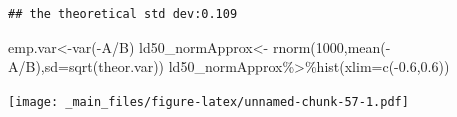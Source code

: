 \documentclass[
]{book}
\newenvironment{Shaded}{\begin{snugshade}}{\end{snugshade}}
\newcommand{\AttributeTok}[1]{\textcolor[rgb]{0.77,0.63,0.00}{#1}}
\newcommand{\DecValTok}[1]{\textcolor[rgb]{0.00,0.00,0.81}{#1}}
\newcommand{\FloatTok}[1]{\textcolor[rgb]{0.00,0.00,0.81}{#1}}
\newcommand{\FunctionTok}[1]{\textcolor[rgb]{0.00,0.00,0.00}{#1}}
\newcommand{\NormalTok}[1]{#1}
\newcommand{\OtherTok}[1]{\textcolor[rgb]{0.56,0.35,0.01}{#1}}
\newcommand{\SpecialCharTok}[1]{\textcolor[rgb]{0.00,0.00,0.00}{#1}}
\newcommand{\StringTok}[1]{\textcolor[rgb]{0.31,0.60,0.02}{#1}}
\theoremstyle{definition}
\theoremstyle{definition}
\theoremstyle{definition}
\theoremstyle{definition}
\theoremstyle{remark}
\begin{document}
\begin{Shaded}
\end{Shaded}

\begin{verbatim}
## the theoretical std dev:0.109
\end{verbatim}

\begin{Shaded}
\begin{Highlighting}[]
\NormalTok{  emp.var}\OtherTok{\textless{}{-}}\FunctionTok{var}\NormalTok{(}\SpecialCharTok{{-}}\NormalTok{A}\SpecialCharTok{/}\NormalTok{B)}
\NormalTok{ ld50\_normApprox}\OtherTok{\textless{}{-}} \FunctionTok{rnorm}\NormalTok{(}\DecValTok{1000}\NormalTok{,}\FunctionTok{mean}\NormalTok{(}\SpecialCharTok{{-}}\NormalTok{A}\SpecialCharTok{/}\NormalTok{B),}\AttributeTok{sd=}\FunctionTok{sqrt}\NormalTok{(theor.var))}
\NormalTok{  ld50\_normApprox}\SpecialCharTok{\%\textgreater{}\%}\FunctionTok{hist}\NormalTok{(}\AttributeTok{xlim=}\FunctionTok{c}\NormalTok{(}\SpecialCharTok{{-}}\FloatTok{0.6}\NormalTok{,}\FloatTok{0.6}\NormalTok{))}
\end{Highlighting}
\end{Shaded}

\texttt{[image: \_main\_files/figure-latex/unnamed-chunk-57-1.pdf]}
\end{document}
